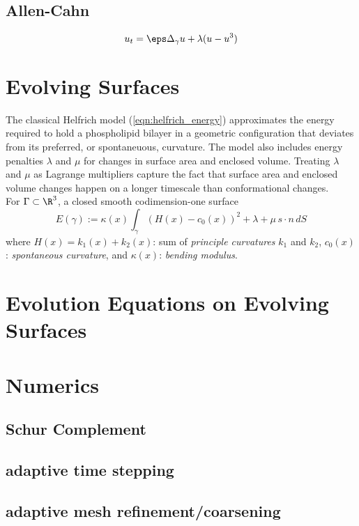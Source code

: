 \documentclass[10pt]{article}
\begin{document}
\subsection{Allen-Cahn}

\begin{equation}
u_t = \eps \Delta_{\gamma} u + \lambda (u - u^3)
   \label{eqn:heat}
\end{equation}




\section{Evolving Surfaces}

The classical Helfrich model (\ref{eqn:helfrich_energy}) approximates the energy
required to hold a phospholipid bilayer in a geometric configuration that
deviates from its preferred, or spontaneuous, curvature. The model also
includes energy penalties $\lambda$ and
$\mu$ for changes in surface area and enclosed volume. Treating $\lambda$ and
$\mu$ as Lagrange multipliers capture the fact that surface area and enclosed
volume changes happen on a longer timescale than conformational changes.\\



For $\Gamma \subset \R^3$, a closed smooth codimension-one surface
\begin{equation}
   E({\gamma}) := \kappa(x) \int_{\gamma} \left( H(x) - c_{0}(x)\right)^2  + \lambda + \mu\, s
\cdot n \, dS 
   \label{eqn:helfrich_energy}
\end{equation}
where $H(x) = k_1(x) + k_2(x)$: sum of \emph{principle curvatures} $k_1$ and
$k_2$, $c_0(x)$: \emph{spontaneous curvature}, and $\kappa(x)$: \emph{bending
modulus}.


\cite{DoganNochetto:2012}


\section{Evolution Equations on Evolving Surfaces}



\section{Numerics}

\subsection{Schur Complement}

\subsection{adaptive time stepping}

\subsection{adaptive mesh refinement/coarsening}







\end{document}
